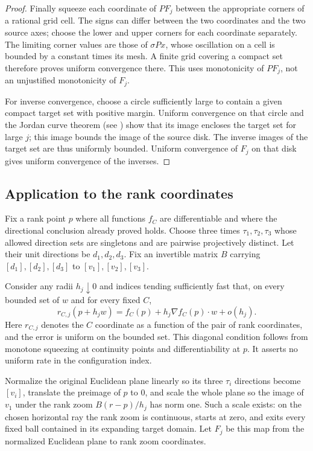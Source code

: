 \begin{proof}
Finally squeeze each coordinate of $P F_j$ between the appropriate
corners of a rational grid cell.  The signs can differ between the
two coordinates and the two source axes; choose the lower and upper
corners for each coordinate separately.  The limiting corner values
are those of $\sigma P x$, whose oscillation on a cell is bounded by
a constant times its mesh.  A finite grid covering a compact set
therefore proves uniform convergence there.  This uses monotonicity
of $P F_j$, not an unjustified monotonicity of $F_j$.

For inverse convergence, choose a circle sufficiently large to contain
a given compact target set with positive margin.  Uniform convergence
on that circle and the Jordan curve theorem
(see \cite{Siebenmann2005}) show that its image
encloses the target set for large $j$; this image bounds the image of
the source disk.  The inverse images of the target set are thus
uniformly bounded.  Uniform convergence of $F_j$ on that disk gives
uniform convergence of the inverses.
\end{proof}

\subsection{Application to the rank coordinates}

Fix a rank point $p$ where all functions $f_C$ are differentiable and
where the directional conclusion already proved holds.  Choose three
times $\tau_1,\tau_2,\tau_3$ whose allowed direction sets are singletons
and are pairwise projectively distinct.  Let their unit directions
be $d_1,d_2,d_3$.  Fix an invertible matrix $B$ carrying
$[d_1],[d_2],[d_3]$ to $[v_1],[v_2],[v_3]$.

Consider any radii $h_j\downarrow0$ and indices tending sufficiently
fast that, on every bounded set of $w$ and for every fixed $C$,
\begin{equation}\label{eq:zoom-expansion}
 r_{C,j}(p+h_jw)=f_C(p)+h_j\nabla f_C(p)\cdot w+o(h_j).
\end{equation}
Here $r_{C,j}$ denotes the $C$ coordinate as a function of the pair
of rank coordinates, and the error is uniform on the bounded set.
This diagonal condition follows from monotone squeezing at continuity
points and differentiability at $p$.  It asserts no uniform rate in
the configuration index.

Normalize the original Euclidean plane linearly so its three
$\tau_i$ directions become $[v_i]$, translate the preimage of $p$ to
$0$, and scale the whole plane so the image of $v_1$ under the rank
zoom $B(r-p)/h_j$ has norm one.  Such a scale exists: on the chosen
horizontal ray the rank zoom is continuous, starts at zero, and exits
every fixed ball contained in its expanding target domain.
Let $F_j$ be this map from the normalized Euclidean plane to rank
zoom coordinates.

